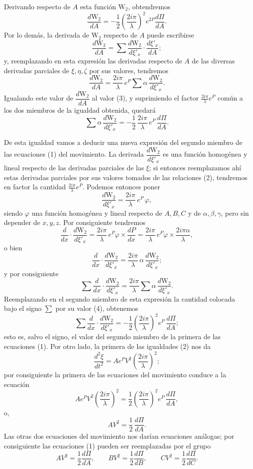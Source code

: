 Derivando respecto de $A$ esta función $\mathrm{W}_2$, obtendremos
\begin{equation}
\frac{d\mathrm{W}_2}{dA}=-\frac{1}{2}\left(\frac{2i\pi}{\lambda}\right)^2 e^{2P}\frac{d\Pi}{dA}.
\tag{3}
\end{equation}
Por lo demás, la derivada de $\mathrm{W}_2$ respecto de $A$ puede escribirse
\[
\frac{d\mathrm{W}_2}{dA}=\sum\frac{d\mathrm{W}_2}{d\xi'_x}\cdot\frac{d\xi'_x}{dA};
\]
y, reemplazando en esta expresión las derivadas respecto de $A$ de las
diversas derivadas parciales de $\xi,\eta,\zeta$ por sus valores, tendremos
\[
\frac{d\mathrm{W}_2}{dA}=\frac{2i\pi}{\lambda}\,e^{P}\sum\alpha\,\frac{d\mathrm{W}_2}{d\xi'_x}.
\]
Igualando este valor de $\dfrac{d\mathrm{W}_2}{dA}$ al valor (3), y suprimiendo el
factor $\frac{2i\pi}{\lambda}e^{P}$ común a los dos miembros de la
igualdad obtenida, quedará
\begin{equation}
\sum\alpha\,\frac{d\mathrm{W}_2}{d\xi'_x}=-\frac{1}{2}\,\frac{2i\pi}{\lambda}\,e^{P}\,\frac{d\Pi}{dA}.
\tag{4}
\end{equation}

De esta igualdad vamos a deducir una nueva expresión del segundo miembro
de las ecuaciones (1) del movimiento. La derivada $\dfrac{d\mathrm{W}_2}{d\xi'_x}$
es una función homogénea y lineal respecto de las derivadas parciales de
las $\xi$; si entonces reemplazamos ahí estas derivadas parciales por sus
valores tomados de las relaciones (2), tendremos en factor la cantidad
$\frac{2i\pi}{\lambda}e^{P}$. Podemos entonces poner
\[
\frac{d\mathrm{W}_2}{d\xi'_x}=\frac{2i\pi}{\lambda}\,e^{P}\,\varphi,
\]
siendo $\varphi$ una función homogénea y lineal respecto de $A,B,C$ y de
$\alpha,\beta,\gamma$, pero sin depender de $x,y,z$. Por consiguiente
tendremos
\[
\frac{d}{dx}\cdot\frac{d\mathrm{W}_2}{d\xi'_x}=\frac{2i\pi}{\lambda}\,e^{P}\varphi\times\frac{dP}{dx}
=\frac{2i\pi}{\lambda}\,e^{P}\varphi\times\frac{2i\pi\alpha}{\lambda},
\]
o bien
\[
\frac{d}{dx}\cdot\frac{d\mathrm{W}_2}{d\xi'_x}=\frac{2i\pi}{\lambda}\,\alpha\,\frac{d\mathrm{W}_2}{d\xi'_x};
\]
y por consiguiente
\[
\sum\frac{d}{dx}\cdot\frac{d\mathrm{W}_2}{d\xi'_x}=\frac{2i\pi}{\lambda}\sum\alpha\,\frac{d\mathrm{W}_2}{d\xi'_x}.
\]
Reemplazando en el segundo miembro de esta expresión la cantidad colocada
bajo el signo $\sum$ por su valor (4), obtenemos
\[
\sum\frac{d}{dx}\cdot\frac{d\mathrm{W}_2}{d\xi'_x}=-\frac{1}{2}\left(\frac{2i\pi}{\lambda}\right)^2 e^{P}\,\frac{d\Pi}{dA};
\]
esto es, salvo el signo, el valor del segundo miembro de la primera de las
ecuaciones (1). Por otro lado, la primera de las igualdades (2) nos da
\[
\frac{d^2\xi}{dt^2}=Ae^{P}V^2\left(\frac{2i\pi}{\lambda}\right)^2;
\]
por consiguiente la primera de las ecuaciones del movimiento conduce a la
ecuación
\[
Ae^{P}V^2\left(\frac{2i\pi}{\lambda}\right)^2=\frac{1}{2}\left(\frac{2i\pi}{\lambda}\right)^2 e^{P}\,\frac{d\Pi}{dA},
\]
o,
\[
AV^2=\frac{1}{2}\,\frac{d\Pi}{dA}.
\]
Las otras dos ecuaciones del movimiento nos darían ecuaciones análogas;
por consiguiente las ecuaciones (1) pueden ser reemplazadas por el grupo
\begin{equation}
AV^2=\frac{1}{2}\frac{d\Pi}{dA},\qquad
BV^2=\frac{1}{2}\frac{d\Pi}{dB},\qquad
CV^2=\frac{1}{2}\frac{d\Pi}{dC}.
\tag{5}
\end{equation}

